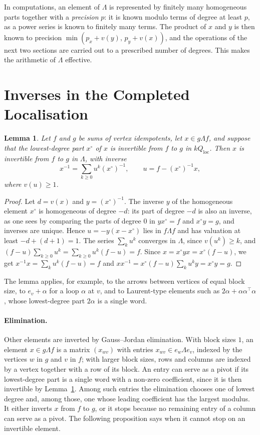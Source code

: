 \documentclass[12pt, a4paper]{report}
\theoremstyle{plain}
\newtheorem{lemma}[theorem]{Lemma}
\theoremstyle{definition}
\theoremstyle{remark}
\theoremstyle{plain}
\begin{document}
In computations, an element of $\Lambda$ is represented by finitely many homogeneous parts together with a \emph{precision} $p$: it is known modulo terms of degree at least $p$, as a power series is known to finitely many terms. The product of $x$ and $y$ is then known to precision $\min(p_x+v(y),\,p_y+v(x))$, and the operations of the next two sections are carried out to a prescribed number of degrees. This makes the arithmetic of $\Lambda$ effective.

\section{Inverses in the Completed Localisation}
\label{sec:lambda-inverses}
\begin{lemma}\label{lem:lambda-units}
Let $f$ and $g$ be sums of vertex idempotents, let $x\in g\Lambda f$, and suppose that the lowest-degree part $x^\circ$ of $x$ is invertible from $f$ to $g$ in $kQ_{\mathrm{loc}}$. Then $x$ is invertible from $f$ to $g$ in $\Lambda$, with inverse
\[ x^{-1}=\sum_{k\geq0}u^k(x^\circ)^{-1},\qquad u=f-(x^\circ)^{-1}x, \]
where $v(u)\geq1$.
\end{lemma}
\begin{proof}
Let $d=v(x)$ and $y=(x^\circ)^{-1}$. The inverse $y$ of the homogeneous element $x^\circ$ is homogeneous of degree $-d$: its part of degree $-d$ is also an inverse, as one sees by comparing the parts of degree $0$ in $yx^\circ=f$ and $x^\circ y=g$, and inverses are unique. Hence $u=-y(x-x^\circ)$ lies in $f\Lambda f$ and has valuation at least $-d+(d+1)=1$. The series $\sum_ku^k$ converges in $\Lambda$, since $v(u^k)\geq k$, and $(f-u)\sum_{k\geq0}u^k=\sum_{k\geq0}u^k(f-u)=f$. Since $x=x^\circ yx=x^\circ(f-u)$, we get $x^{-1}x=\sum_ku^k(f-u)=f$ and $xx^{-1}=x^\circ(f-u)\sum_ku^ky=x^\circ y=g$.
\end{proof}

The lemma applies, for example, to the arrows between vertices of equal block size, to $e_v+\alpha$ for a loop $\alpha$ at $v$, and to Laurent-type elements such as $2\alpha+\alpha\alpha^{\top}\alpha$, whose lowest-degree part $2\alpha$ is a single word.

\paragraph{Elimination.} Other elements are inverted by Gauss--Jordan elimination. With block sizes $1$, an element $x\in g\Lambda f$ is a matrix $(x_{wv})$ with entries $x_{wv}\in e_w\Lambda e_v$, indexed by the vertices $w$ in $g$ and $v$ in $f$; with larger block sizes, rows and columns are indexed by a vertex together with a row of its block. An entry can serve as a pivot if its lowest-degree part is a single word with a non-zero coefficient, since it is then invertible by Lemma~\ref{lem:lambda-units}. Among such entries the elimination chooses one of lowest degree and, among those, one whose leading coefficient has the largest modulus. It either inverts $x$ from $f$ to $g$, or it stops because no remaining entry of a column can serve as a pivot. The following proposition says when it cannot stop on an invertible element.
\end{document}
